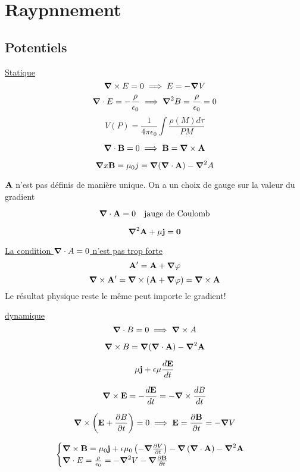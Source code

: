 



\section*{Raypnnement}

\subsection*{Potentiels}

\underline{Statique} $$\grad \times E =0 \implies E = -\grad V$$ 
$$\grad \cdot E = - \frac{\rho}{\epsilon_0} \implies \grad^2 B = \frac{\rho}{\epsilon_0} =0$$ 
$$V(P) = \frac{1}{4\pi\epsilon_0} \int \frac{\rho(M)d\tau}{PM} $$ 

$$\grad \cdot \vb{B} = 0 \implies \vb{B} = \grad \times  \vb{A}$$ 

$$\grad x \vb{B} = \mu_{0} j = \grad(\grad \cdot \vb{A}) - \grad^2 A$$ 

$\vb{A}$ n'est pas définis de manière unique. On a un choix de gauge sur la valeur du gradient

$$\grad \cdot \vb{A} = 0 \quad \text{jauge de Coulomb}$$ 

$$\grad^2 \vb{A} + \mu \vb{j} = \vb{0}$$ 

\begin{tcolorbox}[title=Remarque]
	\underline{La condition $\grad \cdot A = 0$ n'est pas trop forte } 
	$$\vb{A}' = \vb{A} + \grad \varphi  $$ 
	$$\grad \times \vb{A}' = \grad \times (\vb{A} + \grad \varphi) = \grad \times \vb{A}$$ 
	Le résultat physique reste le même peut importe le gradient!
\end{tcolorbox}

\underline{dynamique} $$\grad \cdot B =0 \implies \grad \times A $$ 

$$\grad \times B = \grad (\grad \cdot \vb{A}) - \grad^2 \vb{A}$$ 

$$\mu \vb{j} + \epsilon\mu \frac{d\vb{E}}{dt} $$ 

$$\grad \times  \vb{E} = - \frac{d \vb{E}}{dt} = -\grad \times \frac{dB}{dt} $$ 

$$\grad \times \qty(\vb{E} + \pdv{B}{t}) =  0 \implies \vb{E} = \pdv{\vb{B}}{t}= -\grad V$$ 


$$\begin{cases}\grad \times \vb{B} = \mu_0 \vb{j} + \epsilon \mu_{0} \left( -\grad \pdv{V}{t} \right) -\grad \left( \grad \cdot \vb{A} \right) -\grad^2 \vb{A}\\\grad \cdot E = \frac{\rho}{\epsilon_0} = - \grad^2 V-\grad \pdv{\vb{B}}{t}\end{cases}$$ 

